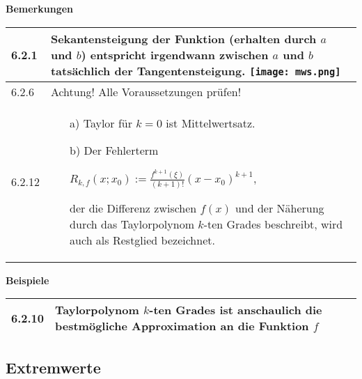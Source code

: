     \noindent
    \textbf{Bemerkungen}
    \begin{table}[H]
    \begin{tabularx}{\textwidth}{X m{16cm}}
        \toprule

        6.2.1 & Sekantensteigung der Funktion (erhalten durch $a$ und $b$) entspricht irgendwann zwischen $a$ und $b$ tatsächlich
                der Tangentensteigung. \hfill \break
                \texttt{[image: mws.png]} \\
        \midrule
        6.2.6 & Achtung! Alle Voraussetzungen prüfen! \\
        \midrule
        6.2.12& \begin{itemize}[topsep=-0.5cm]
                    \item[a)] Taylor für $k=0$ ist Mittelwertsatz.
                    \item[b)] Der Fehlerterm \hfill \break
                                \centerline{$ R_{k,f}(x;x_0) := \frac{f^{k+1}(\xi)}{(k+1)!}(x-x_0)^{k+1}$,}
                                der die Differenz zwischen $f(x)$ und der Näherung durch das Taylorpolynom $k$-ten Grades beschreibt,
                                wird auch als Restglied bezeichnet.
                \end{itemize} \vspace{-0cm} \\


        \bottomrule
    \end{tabularx}
    \end{table}

    \pagebreak

    \noindent
    \textbf{Beispiele}
    \begin{table}[H]
    \begin{tabularx}{\textwidth}{X m{16cm}}
        \toprule

        6.2.10& Taylorpolynom $k$-ten Grades ist anschaulich die bestmögliche Approximation an die Funktion $f$ \\

        \bottomrule
    \end{tabularx}
    \end{table}

\subsection{Extremwerte}

